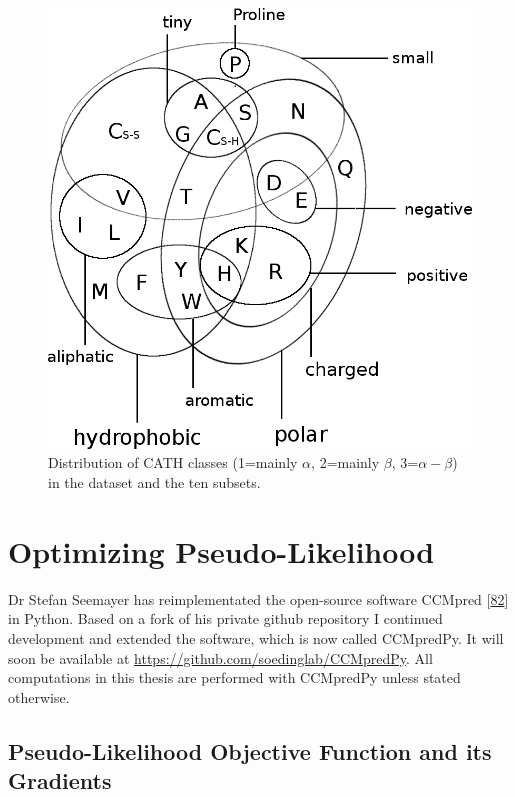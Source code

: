 \documentclass[12pt,a4paper,twoside]{book}
\theoremstyle{definition}
\theoremstyle{definition}
\theoremstyle{remark}
\begin{document}
\begin{figure}
\includegraphics[width=1\linewidth]{img/amino_acid_physico_chemical_properties_venn_diagramm} \caption{Distribution of CATH classes
(1=mainly \(\alpha\), 2=mainly \(\beta\), 3=\(\alpha-\beta\)) in the
dataset and the ten subsets. }\label{fig:dataset-cath-topologies}
\end{figure}

\section{Optimizing
Pseudo-Likelihood}\label{optimizing-pseudo-likelihood}

Dr Stefan Seemayer has reimplementated the open-source software CCMpred
{[}\protect\hyperlink{ref-Seemayer2014}{82}{]} in Python. Based on a
fork of his private github repository I continued development and
extended the software, which is now called CCMpredPy. It will soon be
available at \url{https://github.com/soedinglab/CCMpredPy}. All
computations in this thesis are performed with CCMpredPy unless stated
otherwise.

\subsection{Pseudo-Likelihood Objective Function and its
Gradients}\label{pseudo-likelihood-objective-function-and-its-gradients}
\end{document}

